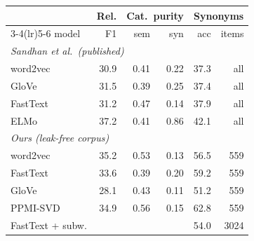 \begin{tabular}{lrrrrr}
\toprule
 & Rel. & \multicolumn{2}{c}{Cat.\ purity} & \multicolumn{2}{c}{Synonyms}\\
\cmidrule(lr){3-4}\cmidrule(lr){5-6}
model & F1 & sem & syn & acc & items\\
\midrule
\multicolumn{6}{l}{\textit{Sandhan et al.\ (published)}}\\
word2vec & 30.9 & 0.41 & 0.22 & 37.3 & all \\
GloVe & 31.5 & 0.39 & 0.25 & 37.4 & all \\
FastText & 31.2 & 0.47 & 0.14 & 37.9 & all \\
ELMo & 37.2 & 0.41 & 0.86 & 42.1 & all \\
\midrule
\multicolumn{6}{l}{\textit{Ours (leak-free corpus)}}\\
word2vec & 35.2 & 0.53 & 0.13 & 56.5 & 559 \\
FastText & 33.6 & 0.39 & 0.20 & 59.2 & 559 \\
GloVe & 28.1 & 0.43 & 0.11 & 51.2 & 559 \\
PPMI-SVD & 34.9 & 0.56 & 0.15 & 62.8 & 559 \\
FastText + subw. &  &  &  & 54.0 & 3024 \\
\bottomrule
\end{tabular}
